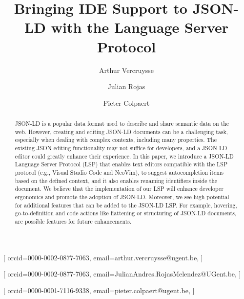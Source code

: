 \documentclass[
]{ceurart}
\begin{document}


\title{Bringing IDE Support to JSON-LD with the Language Server Protocol}


\author[1]{Arthur Vercruysse}[%
orcid=0000-0002-0877-7063,
email=arthur.vercruysse@ugent.be,
]
\author[1]{Julian Rojas}[%
orcid=0000-0002-0877-7063,
email=JulianAndres.RojasMelendez@UGent.be,
]
\author[1]{Pieter Colpaert}[%
orcid=0000-0001-7116-9338,
email=pieter.colpaert@ugent.be,
]
\cormark[1]
\fnmark[1]
\address[1]{IDLab, Department of Electronics and Information Systems, Ghent University – imec}


\begin{abstract}
  JSON-LD is a popular data format used to describe and share semantic data on the web.
  However, creating and editing JSON-LD documents can be a challenging task, especially when dealing with complex contexts, including many properties. The existing JSON editing functionality may not suffice for developers, and a JSON-LD editor could greatly enhance their experience.
  In this paper, we introduce a JSON-LD Language Server Protocol (LSP) that enables text editors compatible with the LSP protocol (e.g., Visual Studio Code and NeoVim), to suggest autocompletion items based on the defined context, and it also enables renaming identifiers inside the document.
  We believe that the implementation of our LSP will enhance developer ergonomics and promote the adoption of JSON-LD. Moreover, we see high potential for additional features that can be added to the JSON-LD LSP. For example, hovering, go-to-definition and code actions like flattening or structuring of JSON-LD documents, are possible features for future enhancements.
\end{abstract}
\end{document}

